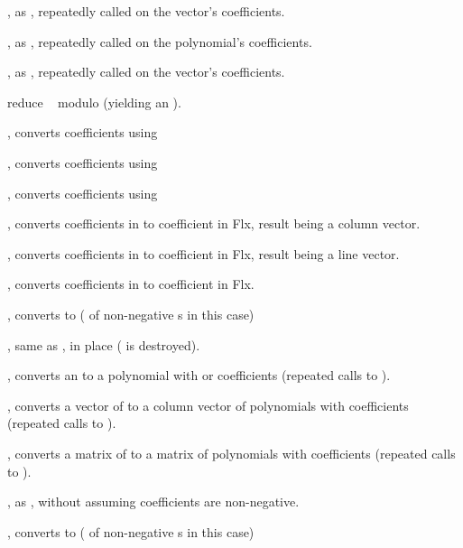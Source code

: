 , as , repeatedly
called on the vector's coefficients.

, as ,
repeatedly called on the polynomial's coefficients.

, as ,
repeatedly called on the vector's coefficients.

 reduce ~ modulo 
(yielding an ).

, converts coefficients using 

, converts coefficients using 

, converts coefficients using 

, converts coefficients in 
to coefficient in Flx, result being a column vector.

, converts coefficients in 
to coefficient in Flx, result being a line vector.

, converts coefficients in 
to coefficient in Flx.


, converts to  ( of non-negative
s in this case)

, same as , in place
( is destroyed).

, converts an  to a polynomial with
 or  coefficients (repeated calls to ).

, converts a vector of  to a column
vector of polynomials with  coefficients (repeated calls to
).

, converts a matrix of  to a matrix of
polynomials with  coefficients (repeated calls to ).

, as , without assuming
coefficients are non-negative.

, converts to  ( of non-negative
s in this case)

